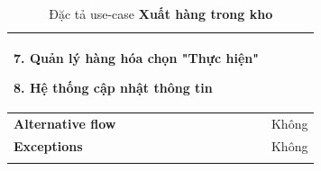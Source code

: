 {\begin{longtable}{| p{} | p{} |}
                    7. Quản lý hàng hóa chọn "Thực hiện"
                    
                    8. Hệ thống cập nhật thông tin
                \\
                \hline
                    \textbf{Alternative flow}
                &
                    Không
                \\
                \hline
                    \textbf{Exceptions} 
                &
                    Không
                \\
                \hline
                \caption{Đặc tả use-case \textbf{Xuất hàng trong kho}}
            \end{longtable}
        }


